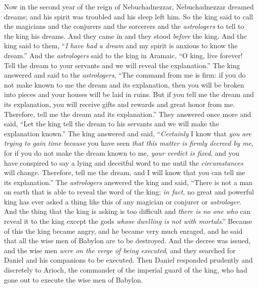 \begin{biblechapter} %
 Now in the second year of the reign of Nebuchadnezzar, Nebuchadnezzar dreamed dreams; and his spirit was troubled and his sleep left him.
\verse So the king said to call the magicians and the conjurers and the sorcerers and the \textit{astrologers} to tell to the king his dreams. And they came in and they stood \textit{before} the king.
\verse And the king said to them, “\textit{I have had a dream} and my spirit is anxious to know the dream.”
\verse And the \textit{astrologers} said to the king in Aramaic, “O king, live forever! Tell the dream to your servants and we will reveal the explanation.”
\verse The king answered and said to the \textit{astrologers}, “The command from me is firm: if you do not make known to me the dream and its explanation, then you will be broken into pieces and your houses will be laid in ruins.
\verse But if you tell me the dream and its explanation, you will receive gifts and rewards and great honor from me. Therefore, tell me the dream and its explanation.”
\verse They answered once more and said, “Let the king tell the dream to his servants and we will make the explanation known.”
\verse The king answered and said, “\textit{Certainly} I know that \textit{you are trying to gain time} \textit{because} you have seen \textit{that this matter is firmly decreed by me},
\verse for if you do not make the dream known to me, \textit{your verdict is fixed}, and you have conspired to say a lying and deceitful word to me until the \textit{circumstances} will change. Therefore, tell me the dream, and I will know that you can tell me its explanation.”
\verse The \textit{astrologers} answered the king and said, “There is not a man on earth that is able to reveal the word of the king; \textit{in fact}, no great and powerful king has ever asked a thing like this of any magician or conjurer or \textit{astrologer}.
\verse And the thing that the king is asking is too difficult and \textit{there is no one who} can reveal it to the king except the gods \textit{whose dwelling is not with mortals}.”
\verse Because of this the king became angry, and he became very much enraged, and he said that all the wise men of Babylon are to be destroyed.
\verse And the decree was issued, and the wise men \textit{were on the verge of being executed}, and they searched for Daniel and his companions to be executed.
\verse Then Daniel responded prudently and discretely to Arioch, the commander of the imperial guard of the king, who had gone out to execute the wise men of Babylon.

\end{biblechapter}
